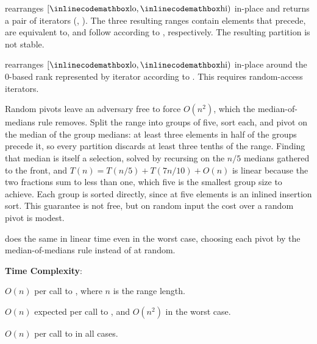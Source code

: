 \begin{compactitem}
  \item {} rearranges $[{\inlinecodemath{lo}}, {\inlinecodemath{hi}})$ in-place and returns a pair of iterators (, ). The three resulting ranges contain elements that precede, are equivalent to, and follow  according to , respectively. The resulting partition is not stable.
  \item {} rearranges $[{\inlinecodemath{lo}}, {\inlinecodemath{hi}})$ in-place around the 0-based rank represented by iterator  according to . This requires random-access iterators.
\end{compactitem}

Random pivots leave an adversary free to force $O(n^{2})$, which the median-of-medians rule removes. Split the range into groups of five, sort each, and pivot on the median of the group medians: at least three elements in half of the groups precede it, so every partition discards at least three tenths of the range. Finding that median is itself a selection, solved by recursing on the $n/5$ medians gathered to the front, and $T(n) = T(n/5) + T(7n/10) + O(n)$ is linear because the two fractions sum to less than one, which five is the smallest group size to achieve. Each group is sorted directly, since at five elements  is an inlined insertion sort. This guarantee is not free, but on random input the cost over a random pivot is modest.

\begin{compactitem}
  \item {} does the same in linear time even in the worst case, choosing each pivot by the median-of-medians rule instead of at random.
\end{compactitem}

\textbf{Time Complexity}:
\begin{compactitem}
  \item $O(n)$ per call to , where $n$ is the range length.
  \item $O(n)$ expected per call to , and $O(n^{2})$ in the worst case.
  \item $O(n)$ per call to  in all cases.
\end{compactitem}

